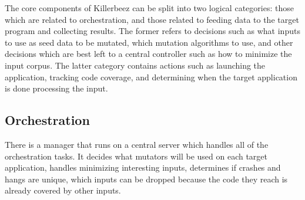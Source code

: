 The core components of Killerbeez can be split into two logical categories:
those which are related to orchestration, and those related to feeding data
to the target program and collecting results.  The former refers to decisions
such as what inputs to use as seed data to be mutated, which mutation
algorithms to use, and other decisions which are best left to a central
controller such as how to minimize the input corpus.  The latter category
contains actions such as launching the application, tracking code coverage,
and determining when the target application is done processing the input.

\subsection{Orchestration}
There is a manager that runs on a central server which handles all of the
orchestration tasks.  It decides what mutators will be used on each target
application, handles minimizing interesting inputs, determines if crashes
and hangs are unique, which inputs can be dropped because the code they
reach is already covered by other inputs.

